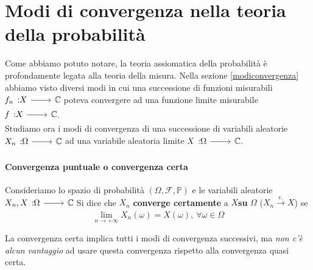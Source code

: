 \section{Modi di convergenza nella teoria della probabilità}
Come abbiamo potuto notare, la teoria assiomatica della probabilità è profondamente legata alla teoria della misura. Nella sezione \ref{modiconvergenza} abbiamo visto diversi modi in cui una successione di funzioni misurabili $\funz{f_n}{X}{\complexset}$ poteva convergere ad una funzione limite misurabile $\funz{f}{X}{\complexset}$.\\
Studiamo ora i modi di convergenza di una successione di variabili aleatorie $\funz{X_n}{\Omega}{\complexset}$ ad una variabile aleatoria limite $\funz{X}{\Omega}{\complexset}$.
\paragraph{Convergenza puntuale o convergenza certa}
\begin{define}
	Consideriamo lo spazio di probabilità $\left(\Omega,\mathcal{F},\mathbb{P}\right)$ e le variabili aleatorie $\funz{X_n,X}{\Omega}{\complexset}$
	Si dice che $X_n$ \textbf{converge certamente} a $X$\textbf{su} $\Omega$ ($X_n\overset{\text{c.}}{\to} X$) se
	\begin{equation}
		\lim_{n\to+\infty}X_n\left(\omega\right)=X\left(\omega\right),\ \forall \omega\in\Omega
	\end{equation}
\end{define}
La convergenza certa implica tutti i modi di convergenza successivi, ma \textit{non c'è alcun vantaggio} ad usare questa convergenza rispetto alla convergenza quasi certa.
